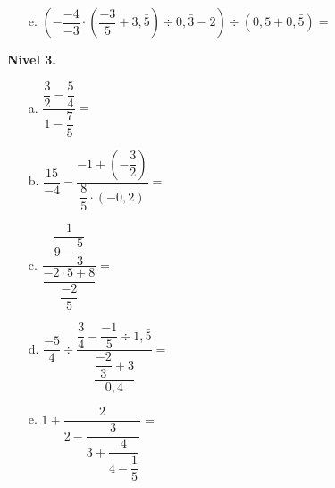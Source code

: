 \documentclass[spanish,letterpaper, 11pt, addpoints, answers]{exam}
\begin{document}
\begin{questions}
\begin{itemize}
\item[e.] $\left(-\dfrac{-4}{-3}\cdot \left(\dfrac{-3}{5}+3{,}\bar{5}\right)\div 0{,}\bar{3}-2\right)\div \left(0{,}5+0{,}\bar{5}\right)=$ 

\end{itemize}

\textbf{Nivel 3.}
\begin{multicols}{2}
\begin{itemize}
\item[a.] $\dfrac{\dfrac{3}{2}-\dfrac{5}{4}}{1-\dfrac{7}{5}}=$
\vspace{1cm}
\item[b.] $\dfrac{15}{-4}-\dfrac{-1+\left(-\dfrac{3}{2}\right)}{\dfrac{8}{5}\cdot \left(-0{,}2\right)}=$
\vspace{1cm}
\item[c.] $\dfrac{\dfrac{1}{9-\dfrac{5}{3}}}{\dfrac{-2\cdot 5+8}{\dfrac{-2}{5}}}=$
\vspace{1cm}
\item[d.] $\dfrac{-5}{4}\div \dfrac{\dfrac{3}{4}-\dfrac{-1}{5}\div 1{,}\bar{5}}{\dfrac{\dfrac{-2}{3}+3}{0{,}4}}=$
\vspace{1cm}
\item[e.] $1+\dfrac{2}{2-\dfrac{3}{3+\dfrac{4}{4-\dfrac{1}{5}}}}=$

\end{itemize}
\end{multicols}
\end{questions}
\end{document}
